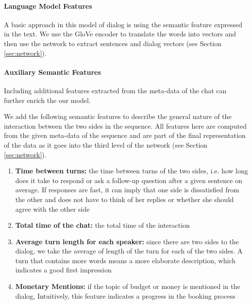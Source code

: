 \paragraph*{Language Model Features}
A basic approach in this model of dialog is 
using the semantic feature expressed in the text. 
We use the GloVe \cite{glove} encoder to translate the words 
into vectors and then use the network to extract sentences and 
dialog vectors (see Section \ref{sec:network}). 



\paragraph*{Auxiliary Semantic Features}\label{sec:semantic}
Including additional features 
extracted from the meta-data of the chat can further enrich the our model. 

We add the following semantic features 
to describe the general nature 
of the interaction between the two sides 
in the sequence. All features here 
are computed from the given meta-data of the sequence and 
are part of the final representation of the data as it goes into the 
third level of the network (see Section \ref{sec:network}). 

\begin{enumerate}
\item {\bf Time between turns: } the time between 
turns of the two sides, i.e. how long does it take to respond or ask a follow-up 
question after a given sentence on average. 
If responses are fast, it can imply that one side is dissatisfied 
from the other and does not have to think of her replies or whether 
she should agree with the other side\label{itm:between}

\item {\bf Total time of the chat: } the total time of the interaction \label{itm:total}

\item {\bf Average turn length for each speaker: } since there are two sides to the dialog, 
we take the average of length of the turn for each of the two sides. 
A turn that contains more words means a more elaborate description, which indicates 
a good first impression\label{itm:sent}


\item {\bf Monetary Mentions: } if the topic of budget or money is mentioned in the dialog, 
Intuitively, this feature indicates a progress in the booking process\label{itm:budget}

\end{enumerate} 

